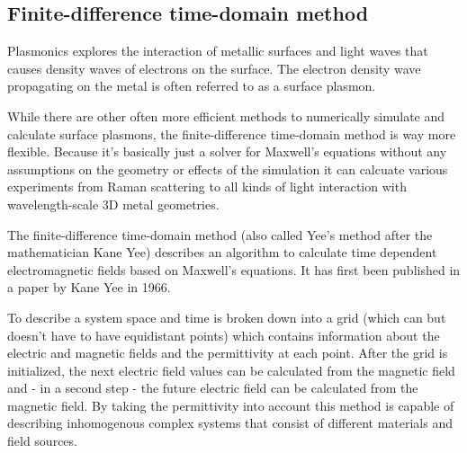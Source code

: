 \subsection{Finite-difference time-domain method}

Plasmonics explores the interaction of metallic surfaces and light waves that causes density waves of electrons on the surface. The electron density wave propagating on the metal is often referred to as a surface plasmon.

While there are other often more efficient methods to numerically simulate and calculate surface plasmons, the finite-difference time-domain method is way more flexible. Because it's basically just a solver for Maxwell's equations without any assumptions on the geometry or effects of the simulation it can calcuate various experiments from Raman scattering to all kinds of light interaction with wavelength-scale 3D metal geometries.

The finite-difference time-domain method (also called Yee's method after the mathematician Kane Yee) describes an algorithm to calculate time dependent electromagnetic fields based on Maxwell's equations. It has first been published in a paper by Kane Yee in 1966\cite{yee}.

To describe a system space and time is broken down into a grid (which can but doesn't have to have equidistant points) which contains information about the electric and magnetic fields and the permittivity at each point. After the grid is initialized, the next electric field values can be calculated from the magnetic field and - in a second step - the future electric field can be calculated from the magnetic field. By taking the permittivity into account this method is capable of describing inhomogenous complex systems that consist of different materials and field sources.
